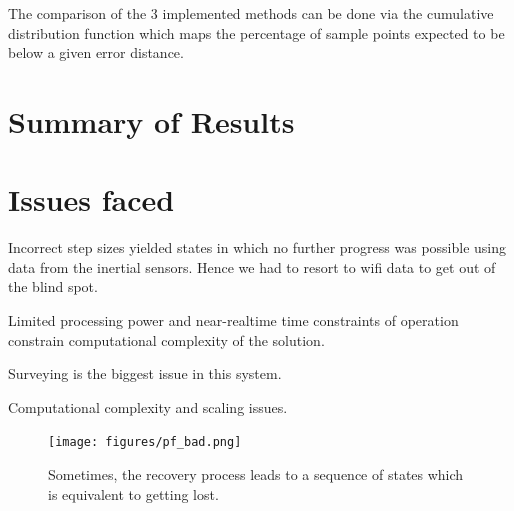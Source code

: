 The comparison of the 3 implemented methods can be done via the cumulative
distribution function which maps the percentage of sample points 
expected to be below a given error distance. 



\section{Summary of Results}

\section{Issues faced}
Incorrect step sizes yielded states in which no further progress was possible
using data from the inertial sensors. Hence we had to resort to wifi data to get
out of the blind spot.

Limited processing power and near-realtime time constraints of operation
constrain computational complexity of the solution.

Surveying is the biggest issue in this system.

Computational complexity and scaling issues.

\begin{figure}
    \centering
    \texttt{[image: figures/pf\_bad.png]}
    \caption{Sometimes, the recovery process leads to a sequence of states 
        which is equivalent to getting lost.\label{fig:pf_bad}}
\end{figure}
